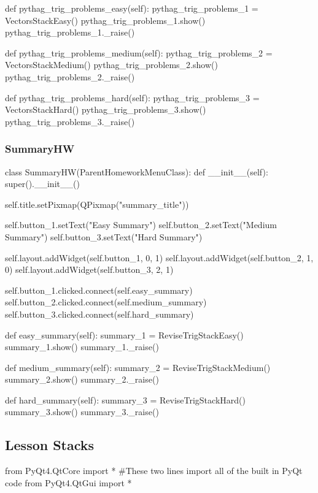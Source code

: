 \begin{landscape}
\begin{python}
    def pythag_trig_problems_easy(self):
        pythag_trig_problems_1 = VectorsStackEasy()
        pythag_trig_problems_1.show()
        pythag_trig_problems_1._raise()

    def pythag_trig_problems_medium(self):
        pythag_trig_problems_2 = VectorsStackMedium()
        pythag_trig_problems_2.show()
        pythag_trig_problems_2._raise()

    def pythag_trig_problems_hard(self):
        pythag_trig_problems_3 = VectorsStackHard()
        pythag_trig_problems_3.show()
        pythag_trig_problems_3._raise()
\end{python}

\subsubsection{SummaryHW}

\begin{python}
class SummaryHW(ParentHomeworkMenuClass):
    def __init__(self):
        super().__init__()

        self.title.setPixmap(QPixmap("summary_title"))

        self.button_1.setText("Easy Summary")
        self.button_2.setText("Medium Summary")
        self.button_3.setText("Hard Summary")

        self.layout.addWidget(self.button_1, 0, 1)
        self.layout.addWidget(self.button_2, 1, 0)
        self.layout.addWidget(self.button_3, 2, 1)

        self.button_1.clicked.connect(self.easy_summary)
        self.button_2.clicked.connect(self.medium_summary)
        self.button_3.clicked.connect(self.hard_summary)
          
    def easy_summary(self):
        summary_1 = ReviseTrigStackEasy()
        summary_1.show()
        summary_1._raise()

    def medium_summary(self):
        summary_2 = ReviseTrigStackMedium()
        summary_2.show()
        summary_2._raise()

    def hard_summary(self):
        summary_3 = ReviseTrigStackHard()
        summary_3.show()
        summary_3._raise()
\end{python}

\subsection{Lesson Stacks}

\begin{python}
from PyQt4.QtCore import * #These two lines import all of the built in PyQt code
from PyQt4.QtGui import *


\end{python}
\end{landscape}
